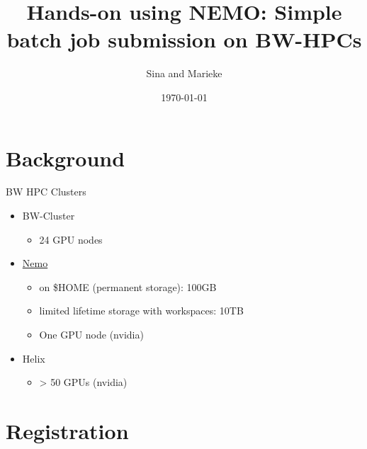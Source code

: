 \documentclass{beamer}
\title[Joint lab meeting]{Hands-on using NEMO: Simple batch job submission on BW-HPCs}
\author{Sina and Marieke}
\institute{Joint Lab meeting}
\date{\today}
\begin{document}
\begin{frame}
  \titlepage
\end{frame}

\section{Background}

\begin{frame}{BW HPC Clusters}

\begin{itemize}
  \item BW-Cluster
  \begin{itemize}
      \item 24 GPU nodes
  \end{itemize}
  \item \href{https://wiki.bwhpc.de/e/NEMO/Hardware#Compute\_and\_Special\_Purpose\_Nodes}{Nemo}
  \begin{itemize}
      \item on \$HOME (permanent storage): 100GB 
      \item limited lifetime storage with workspaces: 10TB  
      \item One GPU node (nvidia)
  \end{itemize}
  \item Helix 
  \begin{itemize}
      \item > 50 GPUs (nvidia)
  \end{itemize}
\end{itemize}

\end{frame}

\section{Registration}
\end{document}
